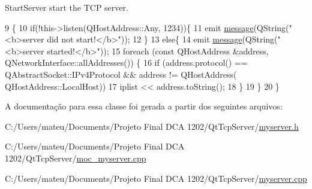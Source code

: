 Start\+Server start the T\+CP server. 


\begin{DoxyCode}
9                           \{
10   \textcolor{keywordflow}{if}(!this->listen(QHostAddress::Any, 1234))\{
11     emit \mbox{\hyperlink{class_my_server_a2b884bce37840b1b461363a37b463b30}{message}}(QString(\textcolor{stringliteral}{"<b>server did not start!</b>"}));
12   \}
13   \textcolor{keywordflow}{else}\{
14     emit \mbox{\hyperlink{class_my_server_a2b884bce37840b1b461363a37b463b30}{message}}(QString(\textcolor{stringliteral}{"<b>server started!</b>"}));
15     \textcolor{keywordflow}{foreach} (\textcolor{keyword}{const} QHostAddress &address, QNetworkInterface::allAddresses()) \{
16       \textcolor{keywordflow}{if} (address.protocol() == QAbstractSocket::IPv4Protocol && address != QHostAddress(
      QHostAddress::LocalHost))
17         iplist << address.toString();
18     \}
19   \}
20 \}
\end{DoxyCode}


A documentação para essa classe foi gerada a partir dos seguintes arquivos\+:\begin{DoxyCompactItemize}
\item 
C\+:/\+Users/mateu/\+Documents/\+Projeto Final D\+C\+A 1202/\+Qt\+Tcp\+Server/\mbox{\hyperlink{myserver_8h}{myserver.\+h}}\item 
C\+:/\+Users/mateu/\+Documents/\+Projeto Final D\+C\+A 1202/\+Qt\+Tcp\+Server/\mbox{\hyperlink{moc__myserver_8cpp}{moc\+\_\+myserver.\+cpp}}\item 
C\+:/\+Users/mateu/\+Documents/\+Projeto Final D\+C\+A 1202/\+Qt\+Tcp\+Server/\mbox{\hyperlink{myserver_8cpp}{myserver.\+cpp}}\end{DoxyCompactItemize}
